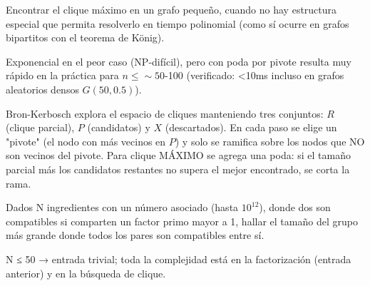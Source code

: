  Encontrar el clique máximo en un grafo pequeño, cuando no hay estructura especial que permita resolverlo en tiempo polinomial (como sí ocurre en grafos bipartitos con el teorema de König).

 Exponencial en el peor caso (NP-difícil), pero con poda por pivote resulta muy rápido en la práctica para $n \le \sim 50$-100 (verificado: <10ms incluso en grafos aleatorios densos $G(50, 0.5)$).

 Bron-Kerbosch explora el espacio de cliques manteniendo tres conjuntos: $R$ (clique parcial), $P$ (candidatos) y $X$ (descartados). En cada paso se elige un "pivote" (el nodo con más vecinos en $P$) y solo se ramifica sobre los nodos que NO son vecinos del pivote. Para clique MÁXIMO se agrega una poda: si el tamaño parcial más los candidatos restantes no supera el mejor encontrado, se corta la rama.


Dados N ingredientes con un número asociado (hasta $10^{12}$), donde dos son compatibles si comparten un factor primo mayor a 1, hallar el tamaño del grupo más grande donde todos los pares son compatibles entre sí.

 N ≤ 50 → entrada trivial; toda la complejidad está en la factorización (entrada anterior) y en la búsqueda de clique.


